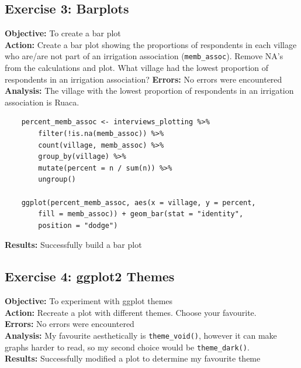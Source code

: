 \documentclass{article}
\begin{document}
\subsection{Exercise 3: Barplots}
\textbf{Objective:} To create a bar plot\\
\textbf{Action:} Create a bar plot showing the proportions of respondents in each village who are/are not part of an irrigation association (\verb|memb_assoc|). Remove NA's from the calculations and plot. What village had the lowest proportion of respondents in an irrigation association?
\textbf{Errors:} No errors were encountered\\
\textbf{Analysis:} The village with the lowest proportion of respondents in an irrigation association is Ruaca.
\begin{verbatim}
    percent_memb_assoc <- interviews_plotting %>%
        filter(!is.na(memb_assoc)) %>%
        count(village, memb_assoc) %>%
        group_by(village) %>%
        mutate(percent = n / sum(n)) %>%
        ungroup()

    ggplot(percent_memb_assoc, aes(x = village, y = percent, 
        fill = memb_assoc)) + geom_bar(stat = "identity", 
        position = "dodge")
\end{verbatim}
\textbf{Results:} Successfully build a bar plot

\subsection{Exercise 4: ggplot2 Themes}
\textbf{Objective:} To experiment with ggplot themes\\
\textbf{Action:} Recreate a plot with different themes. Choose your favourite.\\
\textbf{Errors:} No errors were encountered\\
\textbf{Analysis:} My favourite aesthetically is \verb|theme_void()|, however it can make graphs harder to read, so my second choice would be \verb|theme_dark()|.\\
\textbf{Results:} Successfully modified a plot to determine my favourite theme

\newpage
\end{document}
